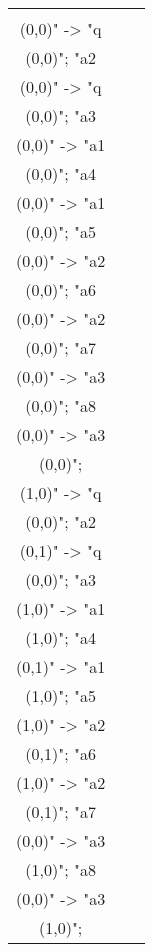 \documentclass[12pt]{article}
\theoremstyle{defi}
\theoremstyle{not}
\theoremstyle{prob}
\begin{document}
          \begin{figure}
            \centering
            \begin{tabular}{ccc}
              \begin{tikzpicture}[>=stealth]
              \graph [ layered layout, nodes = {scale=0.75, align=center} ] {
              "a1\\ (0,0)" -> "q\\ (0,0)";
              "a2\\ (0,0)" -> "q\\ (0,0)";
              "a3\\ (0,0)" -> "a1\\ (0,0)";
              "a4\\ (0,0)" -> "a1\\ (0,0)";
              "a5\\ (0,0)" -> "a2\\ (0,0)";
              "a6\\ (0,0)" -> "a2\\ (0,0)";
              "a7\\ (0,0)" -> "a3\\ (0,0)";
              "a8\\ (0,0)" -> "a3\\ (0,0)";
              };
              \end{tikzpicture} &
              \begin{tikzpicture}[>=stealth]
              \graph [ layered layout, nodes = {scale=0.75, align=center} ] {
              "a1\\ (1,0)" -> "q\\ (0,0)";
              "a2\\ (0,1)" -> "q\\ (0,0)";
              "a3\\ (1,0)" -> "a1\\ (1,0)";
              "a4\\ (0,1)" -> "a1\\ (1,0)";
              "a5\\ (1,0)" -> "a2\\ (0,1)";
              "a6\\ (1,0)" -> "a2\\ (0,1)";
              "a7\\ (0,0)" -> "a3\\ (1,0)";
              "a8\\ (0,0)" -> "a3\\ (1,0)";
              };
              \end{tikzpicture} &

\end{tabular}
\end{figure}
\end{document}
